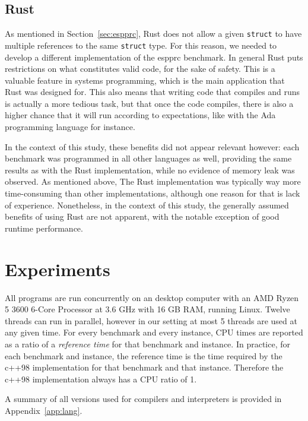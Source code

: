 \documentclass[11pt,a4paper,notitlepage]{article}
\begin{document}
\subsection{Rust}
As mentioned in Section~\ref{sec:espprc}, Rust does not allow a given
\verb|struct| to have multiple references to the same \verb|struct|
type. For this reason, we needed to develop a different implementation
of the espprc benchmark. In general Rust puts restrictions on what
constitutes valid code, for the sake of safety. This is a valuable
feature in systems programming, which is the main application that Rust was
designed for. This also means that writing code that compiles and runs
is actually a more tedious task, but that once the code compiles,
there is also a higher chance that it will run according to
expectations, like with the Ada programming language for instance.

In the context of this study, these benefits did not appear relevant
however: each benchmark was programmed in all other languages as well,
providing the same results as with the Rust implementation, while no
evidence of memory leak was observed. As mentioned above, The Rust
implementation was typically way more time-consuming than other
implementations, although one reason for that is lack of
experience. Nonetheless, in the context of this study, the generally
assumed benefits of using Rust are not apparent, with the notable
exception of good runtime performance.

\section{Experiments}
All programs are run concurrently on an desktop computer with an AMD
Ryzen 5 3600 6-Core Processor at 3.6 GHz with 16 GB RAM, running
Linux. Twelve threads can
run in parallel, however in our setting at most 5 threads are used at
any given time. For every benchmark and every instance, CPU times are
reported as a ratio of a \emph{reference time} for that benchmark and
instance. In practice, for each benchmark and instance, the reference
time is the time required by the c++98 implementation for that
benchmark and that instance. Therefore the c++98 implementation always
has a CPU ratio of 1.

A summary of all versions used for compilers and interpreters is
provided in Appendix~\ref{app:lang}.
\end{document}
